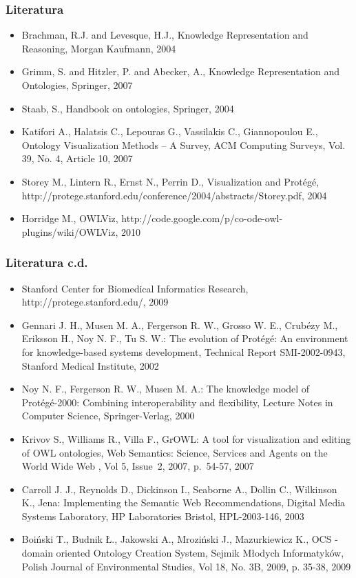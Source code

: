\documentclass{beamer}
\begin{document}
\begin{frame}
  \frametitle{Literatura}
\begin{itemize}


\item Brachman, R.J. and Levesque, H.J., Knowledge Representation and Reasoning, Morgan Kaufmann, 2004
\item Grimm, S. and Hitzler, P. and Abecker, A., Knowledge Representation and Ontologies, Springer, 2007
\item Staab, S., Handbook on ontologies, Springer, 2004
\item Katifori A., Halatsis C., Lepouras G., Vassilakis C., Giannopoulou E., Ontology Visualization Methods – A Survey, ACM Computing Surveys, Vol. 39, No. 4, Article 10, 2007
\item Storey M., Lintern R., Ernst N., Perrin D., Visualization and Protégé, http://protege.stanford.edu/conference/2004/abstracts/Storey.pdf, 2004
\item Horridge M., OWLViz, http://code.google.com/p/co-ode-owl-plugins/wiki/OWLViz, 2010
\end{itemize}
\end{frame}
\begin{frame}
  \frametitle{Literatura c.d.}
\begin{itemize}

\item Stanford Center for Biomedical Informatics Research, http://protege.stanford.edu/, 2009
\item Gennari J. H., Musen M. A., Fergerson R. W., Grosso W. E., Crubézy M., Eriksson H., Noy N. F., Tu S. W.: The evolution of Protégé: An environment for knowledge-based systems development, Technical Report SMI-2002-0943, Stanford Medical Institute, 2002
\item Noy N. F., Fergerson R. W., Musen M. A.: The knowledge model of Protégé-2000: Combining interoperability and flexibility, Lecture Notes in Computer Science, Springer-Verlag, 2000
\item Krivov S., Williams R., Villa F., GrOWL: A tool for visualization and editing of OWL ontologies, Web Semantics: Science, Services and Agents on the World Wide Web , Vol 5, Issue 2, 2007, p. 54-57, 2007
\item Carroll J. J., Reynolds D., Dickinson I., Seaborne A., Dollin C., Wilkinson K., Jena: Implementing the Semantic Web Recommendations, Digital Media Systems Laboratory, HP Laboratories Bristol, HPL-2003-146, 2003
\item Boiński T., Budnik Ł., Jakowski A., Mroziński J., Mazurkiewicz K., OCS - domain oriented Ontology Creation System, Sejmik Młodych Informatyków, Polish Journal of Environmental Studies, Vol 18, No. 3B, 2009, p. 35-38, 2009
\end{itemize}
\end{frame}
\end{document}
